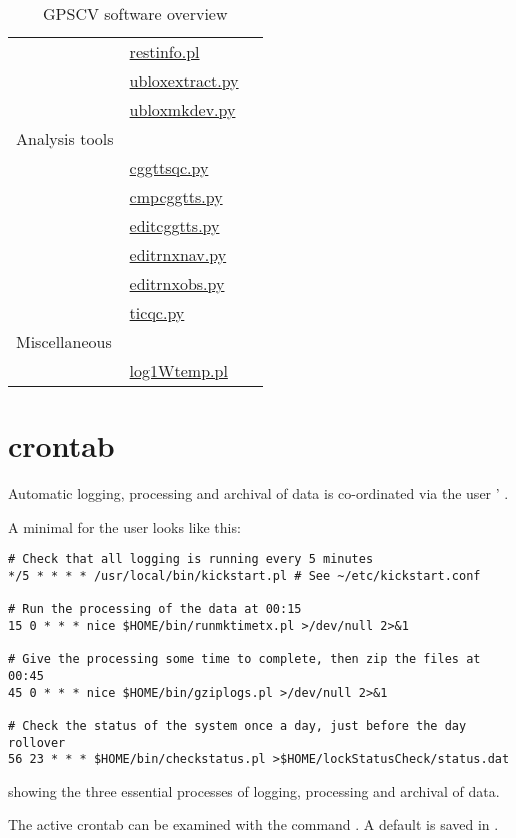 \begin{table}[h]
\begin{tabular}{l|l|l}
	& \hyperlink{h:restinfo}{restinfo.pl} & \\
	& \hyperlink{h:ubloxextract}{ubloxextract.py} & \\
	& \hyperlink{h:ubloxmkdev}{ubloxmkdev.py} & \\
	\hline
Analysis tools & & \\
	& \hyperlink{h:cggttsqc}{cggttsqc.py} & \\
	& \hyperlink{h:cmpcggtts}{cmpcggtts.py} & \\
	& \hyperlink{h:editcggtts}{editcggtts.py} & \\
	& \hyperlink{h:editrnxnav}{editrnxnav.py} & \\
	& \hyperlink{h:editrnxobs}{editrnxobs.py} & \\
	& \hyperlink{h:ticqc}{ticqc.py} & \\
Miscellaneous & & \\
  & \hyperlink{h:log1Wtemp}{log1Wtemp.pl} & \\ 
	\hline
\end{tabular}
\caption{GPSCV software overview \label{t:OTTPSoftware} }
\end{table}

\section{crontab \label{ss:crontab}}

Automatic logging, processing and archival of data is co-ordinated via the user ' .

A minimal  for the user  looks like this:
\begin{lstlisting}
# Check that all logging is running every 5 minutes
*/5 * * * * /usr/local/bin/kickstart.pl # See ~/etc/kickstart.conf

# Run the processing of the data at 00:15
15 0 * * * nice $HOME/bin/runmktimetx.pl >/dev/null 2>&1 

# Give the processing some time to complete, then zip the files at 00:45
45 0 * * * nice $HOME/bin/gziplogs.pl >/dev/null 2>&1

# Check the status of the system once a day, just before the day rollover
56 23 * * * $HOME/bin/checkstatus.pl >$HOME/lockStatusCheck/status.dat
\end{lstlisting}
showing the three essential processes of logging, processing and archival of data.

The active crontab can be examined with the command . 
A default  is saved in . 

